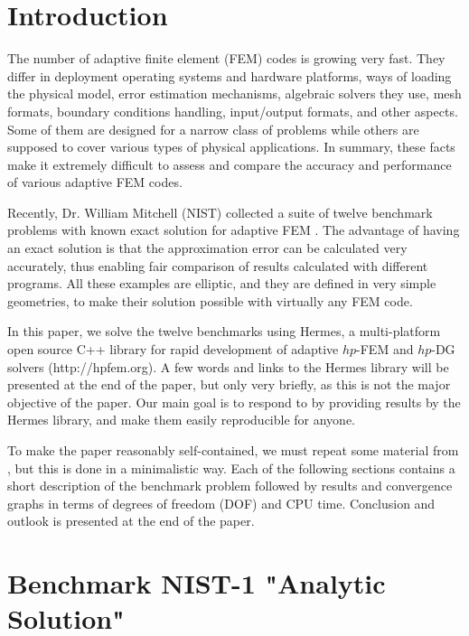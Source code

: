\documentclass[12pt]{elsarticle}
\begin{document}
\section{Introduction}
\label{sec:intro}

The number of adaptive finite element (FEM) codes is growing very fast.
They differ in deployment operating systems and hardware platforms,
ways of loading the physical model, error estimation mechanisms,
algebraic solvers they use, mesh formats, boundary conditions
handling, input/output formats, and other aspects. Some of them are
designed for a narrow class of problems while others are supposed to
cover various types of physical applications. In summary, these facts 
make it extremely difficult to assess and compare the accuracy and 
performance of various adaptive FEM codes.

Recently, Dr. William Mitchell (NIST) collected a suite of
twelve benchmark problems with known exact solution for adaptive
FEM \cite{mitchell-1}. The advantage of having an exact solution is that
the approximation error can be calculated very accurately, thus
enabling fair comparison of results calculated with different
programs. All these examples are elliptic, and they are defined
in very simple geometries, to make their solution possible with
virtually any FEM code.

In this paper, we solve the twelve benchmarks using
Hermes, a multi-platform open source C++
library for rapid development of adaptive $hp$-FEM
and $hp$-DG solvers (http://hpfem.org). A few words
and links to the Hermes library will be presented at the
end of the paper, but only very briefly, as this is not 
the major objective of the paper. Our main goal is to 
respond to \cite{mitchell-1} by providing results by
the Hermes library, and make them easily reproducible
for anyone.

To make the paper reasonably self-contained, we must repeat some
material from \cite{mitchell-1}, but this is done in a minimalistic way.
Each of the following sections contains a short description of
the benchmark problem followed by results and convergence graphs in terms of degrees
of freedom (DOF) and CPU time. Conclusion and outlook
is presented at the end of the paper.


\section{Benchmark NIST-1 "Analytic Solution"}
\label{sec:bench-1}
\end{document}
